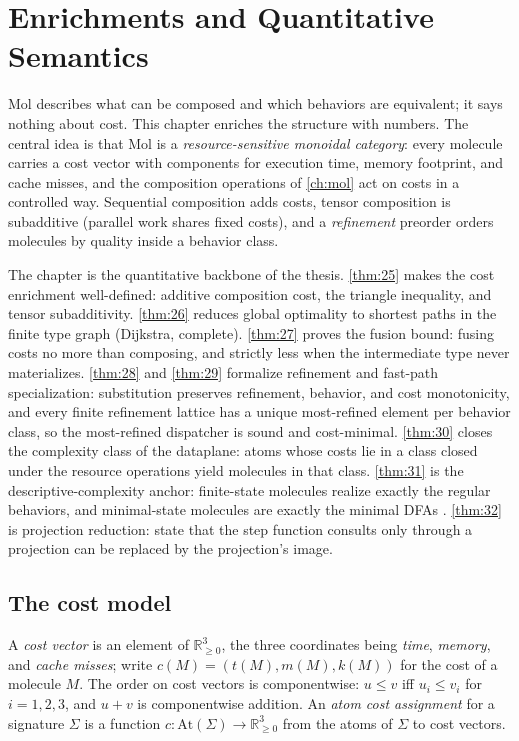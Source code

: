 \chapter{Enrichments and Quantitative Semantics}\label{ch:enrich}

Mol describes what can be composed and which behaviors are equivalent; it says
nothing about cost. This chapter enriches the structure with numbers. The
central idea is that Mol is a \emph{resource-sensitive monoidal category}:
every molecule carries a cost vector with components for execution time,
memory footprint, and cache misses, and the composition operations of
\autoref{ch:mol} act on costs in a controlled way. Sequential composition
adds costs, tensor composition is subadditive (parallel work shares fixed
costs), and a \emph{refinement} preorder orders molecules by quality inside a
behavior class.

The chapter is the quantitative backbone of the thesis. \autoref{thm:25} makes the cost
enrichment well-defined: additive composition cost, the triangle inequality,
and tensor subadditivity. \autoref{thm:26} reduces global optimality to shortest paths in
the finite type graph (Dijkstra, complete). \autoref{thm:27} proves the fusion bound:
fusing costs no more than composing, and strictly less when the intermediate
type never materializes. \autoref{thm:28} and \autoref{thm:29} formalize refinement and fast-path
specialization: substitution preserves refinement, behavior, and cost
monotonicity, and every finite refinement lattice has a unique most-refined
element per behavior class, so the most-refined dispatcher is sound and
cost-minimal. \autoref{thm:30} closes the complexity class of the dataplane: atoms whose
costs lie in a class closed under the resource operations yield molecules in
that class. \autoref{thm:31} is the descriptive-complexity anchor: finite-state molecules
realize exactly the regular behaviors, and minimal-state molecules are exactly
the minimal DFAs \cite{nerode}\cite{hopcroft}. \autoref{thm:32} is projection reduction:
state that the step function consults only through a projection can be
replaced by the projection's image.

\section{The cost model}\label{sec:enrich-cost}

\begin{definition}\label{def:cost}
A \emph{cost vector} is an element of $\mathbb{R}_{\ge 0}^{3}$, the three
coordinates being \emph{time}, \emph{memory}, and \emph{cache misses}; write
$c (M) = (t (M), m (M), k (M))$ for the cost of a molecule $M$. The order on cost
vectors is componentwise: $u \le v$ iff $u_i \le v_i$ for $i = 1, 2, 3$, and
$u + v$ is componentwise addition. An \emph{atom cost assignment} for a
signature $\Sigma$ is a function $c \colon \mathrm{At} (\Sigma) \to
\mathbb{R}_{\ge 0}^{3}$ from the atoms of $\Sigma$ to cost vectors.
\end{definition}

